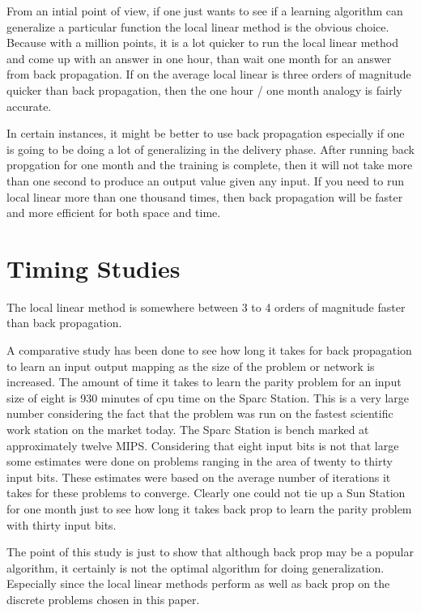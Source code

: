 	From an intial point of view, if one just wants to see if a
learning algorithm can generalize a particular function the local linear
method is the obvious choice.  Because with a million points, it is a
lot quicker to run the local linear method and come up with an answer
in one hour, than wait one month for an answer from back propagation.
If on the average local linear is three orders of magnitude quicker
than back propagation, then the one hour / one month analogy is fairly
accurate.  

	In certain instances, it might be better to use back
propagation especially if one is going to be doing a lot of
generalizing in the delivery phase.  After running back propgation for
one month and the training is complete, then it will not take more
than one second to produce an output value given any input.  If you
need to run local linear more than one thousand times, then back
propagation will be faster and more efficient for both space and time.

\section{Timing Studies}

	The local linear method is somewhere between 3 to 4 orders of
magnitude faster than back propagation.  

	A comparative study has been done to see how long it takes for
back propagation to learn an input output mapping as the size of the
problem or network is increased.  The amount of time it takes to learn
the parity problem for an input size of eight is 930 minutes of cpu
time on the Sparc Station.  This is a very large number considering
the fact that the problem was run on the fastest scientific work
station on the market today.  The Sparc Station is bench marked at
approximately twelve MIPS.  Considering that eight input bits is not
that large some estimates were done on problems ranging in the area of
twenty to thirty input bits.  These estimates were based on the
average number of iterations it takes for these problems to converge.
Clearly one could not tie up a Sun Station for one month just to see
how long it takes back prop to learn the parity problem with thirty
input bits.
	
	The point of this study is just to show that although back
prop may be a popular algorithm, it certainly is not the optimal
algorithm for doing generalization.  Especially since the local linear
methods perform as well as back prop on the discrete problems chosen
in this paper.


